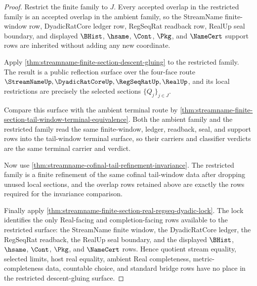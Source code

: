 \begin{proof}
Restrict the finite family to $J$. Every accepted overlap in the restricted
family is an accepted overlap in the ambient family, so the StreamName
finite-window row, DyadicRatCore ledger row, RegSeqRat readback row, RealUp seal
boundary, and displayed $\BHist$, $\hsame$, $\Cont$, $\Pkg$, and $\NameCert$
support rows are inherited without adding any new coordinate.

Apply \autoref{thm:streamname-finite-section-descent-gluing} to the restricted
family. The result is a public reflection surface over the four-face route
$\StreamNameUp,\DyadicRatCoreUp,\RegSeqRatUp,\RealUp$, and its local
restrictions are precisely the selected sections $\{Q_j\}_{j \in J}$.

Compare this surface with the ambient terminal route by
\autoref{thm:streamname-finite-section-tail-window-terminal-equivalence}. Both
the ambient family and the restricted family read the same finite-window,
ledger, readback, seal, and support rows into the tail-window terminal surface,
so their carriers and classifier verdicts are the same terminal carrier and
verdict.

Now use \autoref{thm:streamname-cofinal-tail-refinement-invariance}. The
restricted family is a finite refinement of the same cofinal tail-window data
after dropping unused local sections, and the overlap rows retained above are
exactly the rows required for the invariance comparison.

Finally apply \autoref{thm:streamname-finite-section-real-regseq-dyadic-lock}.
The lock identifies the only Real-facing and completion-facing rows available to
the restricted surface: the StreamName finite window, the DyadicRatCore ledger,
the RegSeqRat readback, the RealUp seal boundary, and the displayed $\BHist$,
$\hsame$, $\Cont$, $\Pkg$, and $\NameCert$ rows. Hence quotient stream equality,
selected limits, host real equality, ambient Real completeness,
metric-completeness data, countable choice, and standard bridge rows have no
place in the restricted descent-gluing surface.
\end{proof}

